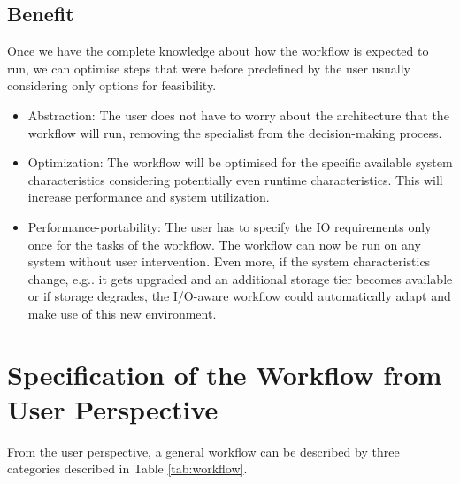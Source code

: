 \documentclass[a4paper]{article}
\begin{document}
\subsection{Benefit}

Once we have the complete knowledge about how the workflow is expected to run, we can optimise steps that were before predefined by the user usually considering only options for feasibility.

\begin{itemize}
\item Abstraction: The user does not have to worry about the architecture that the workflow will run, removing the specialist from the decision-making process.

\item Optimization: The workflow will be optimised for the specific available system characteristics considering potentially even runtime characteristics.
This will increase performance and system utilization.

\item Performance-portability: The user has to specify the IO requirements only once for the tasks of the workflow.
The workflow can now be run on any system without user intervention.
Even more, if the system characteristics change, e.g.. it gets upgraded and an additional storage tier becomes available or if storage degrades, the I/O-aware workflow could automatically adapt and make use of this new environment.
\end{itemize}




\section{Specification of the Workflow from User Perspective}

From the user perspective, a general workflow can be described by three categories described in Table \ref{tab:workflow}.
\end{document}
